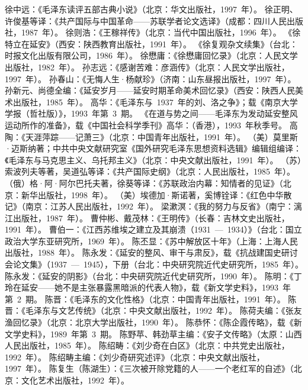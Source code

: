 \begin{thebibliography}{999}
\bibitem{}徐中远：《毛泽东读评五部古典小说》（北京：华文出版社，1997~年）。
\bibitem{}徐正明、许俊基等译：《共产国际与中国革命——苏联学者论文选译》（成都：四川人民出版社，1987~年）。
\bibitem{}徐则浩：《王稼祥传》（北京：当代中国出版社，1996~年）。
\bibitem{}《徐特立在延安》（西安：陕西教育出版社，1991~年）。
\bibitem{}《徐复观杂文续集》（台北：时报文化出版有限公司，1986~年）。
\bibitem{}徐懋庸：《徐懋庸回忆录》（北京：人民文学出版社，1982~年）。
\bibitem{}孙志远：《感谢苦难：彦涵传》（北京：人民文学出版社，1997~年）。
\bibitem{}孙春山：《无悔人生·杨献珍》（济南：山东昼报出版社，1997~年）。
\bibitem{}孙新元、尚德全编：《延安岁月——延安时期革命美术回忆录》（西安：陕西人民美术出版社，1985~年）。
\bibitem{}高华：《毛泽东与~1937~年的刘、洛之争》；载《南京大学学报（哲社版）》，1993~年第~3~期。
\bibitem{}《在道与势之间——毛泽东为发动延安整风运动所作的准备》，载《中国社会科学季刊》高华：（香港），1993~年秋季号。
\bibitem{}高陶：《天涯萍踪——记萧三》（北京：中国青年出版社，1991~年）。
\bibitem{}（美）莫里斯·迈斯纳著；中共中央文献研究室《国外研究毛泽东思想资料选辑》编辑组编译：《毛泽东与马克思主义、乌托邦主义》（北京：中央文献出版社，1991~年）。
\bibitem{}（苏）索波列夫等著，吴道弘等译：《共产国际史纲》（北京：人民出版社，1985~年）。
\bibitem{}（俄）格·阿·阿尔巴托夫著，徐葵等译：《苏联政治内幕：知情者的见证》（北京：新华出版社，1998~年）。
\bibitem{}（美）埃德加·斯诺著，奚博铨译：《红色中华散记》（南京：江苏人民出版社，1992~年）。
\bibitem{}梁漱溟：《我的努力与反省》（南宁：漓江出版社，1987~年）。
\bibitem{}曹仲彬、戴茂林：《王明传》（长春：吉林文史出版社，1991~年）。
\bibitem{}曹伯一：《江西苏维埃之建立及其崩溃（1931~—~1934）》（台北：国立政治大学东亚研究所，1969~年）。
\bibitem{}陈丕显：《苏中解放区十年》（上海：上海人民出版社，1988~年）。
\bibitem{}陈永发：《延安的整风、审干与肃反》，载《抗战建国史研讨会论文集》（1937~—~1945），下册（台北：中央研究院近代史研究所，1985~年）。
\bibitem{}陈永发：《延安的阴影》（台北：中央研究院近代史研究所，1990~年）。
\bibitem{}陈明：《丁玲在延安——她不是主张暴露黑暗派的代表人物》，载《新文学史料》，1993~年第~2~期。
\bibitem{}陈晋：《毛泽东的文化性格》（北京：中国青年出版社，1991~年）。
\bibitem{}陈晋：《毛泽东与文艺传统》（北京：中央文献出版社，1992~年）。
\bibitem{}陈荷夫编：《张友渔回忆录》（北京：北京大学出版社，1990~年）。
\bibitem{}陈恭怀：《陈企霞传略》，载《新文学史料》，1989~年第~3~期。
\bibitem{}陈野苹、韩劲草主编：《安子文传略》（太原：山西人民出版社，1985~年）。
\bibitem{}陈绍畴：《刘少奇在白区》（北京：中共党史出版社，1992~年）。
\bibitem{}陈绍畴主编：《刘少奇研究述评》（北京：中央文献出版社，1997~年）。
\bibitem{}陈复生（陈湖生）：《三次被开除党籍的人——一个老红军的自述》（北京：文化艺术出版社，1992~年）。

\end{thebibliography}
